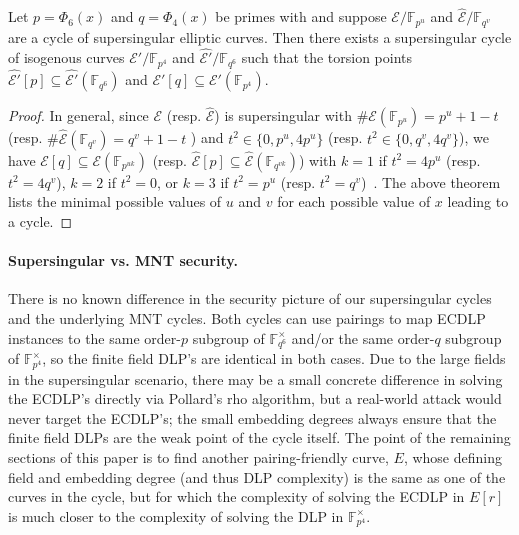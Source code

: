 \documentclass[version=preprint]{iacrcc}
\newcommand{\F}{\mathbb{F}}
\newcommand{\EC}{\mathcal{E}}
\begin{document}
\begin{corollary}\label{coll}
    Let $p=\Phi_6(x)$ and $q=\Phi_4(x)$ be primes with and suppose $\EC/\F_{p^u}$ and $\hat{\EC}/\F_{q^v}$ are a cycle of supersingular elliptic curves. Then there exists a supersingular cycle of isogenous curves $\EC'/\F_{p^4}$ and $\hat{\EC'}/\F_{q^6}$ such that the torsion points $\hat{\EC'}[p]\subseteq \hat{\EC'}(\F_{q^6})$ and $\EC'[q] \subseteq \EC'(\F_{p^4})$.
\end{corollary}
\begin{proof}
    In general, since $\EC$ (resp. $\hat{\EC}$) is supersingular with $\#\EC(\F_{p^u})=p^u+1-t$ (resp. $\#\hat{\EC}(\F_{q^v})=q^v+1- t$ ) and $t^2\in\{0,p^u,4p^u\}$ (resp. $t^2\in\{0,q^v,4q^v\}$), we have $\EC[q] \subseteq \EC(\F_{p^{uk}})$ (resp. $\hat{\EC}[p] \subseteq \hat{\EC}(\F_{q^{vk}})$) with $k=1$ if $t^2=4p^u$ (resp. $t^2=4q^v$), $k=2$ if $t^2=0$, or $k=3$ if $t^2=p^u$ (resp. $t^2=q^v$)~\cite[Table 1]{MOV}. The above theorem lists the minimal possible values of $u$ and $v$ for each possible value of $x$ leading to a cycle. 
\end{proof}

\paragraph{Supersingular vs. MNT security.} There is no known difference in the security picture of our supersingular cycles and the underlying MNT cycles. Both cycles can use pairings to map ECDLP instances to the same order-$p$ subgroup of $\F_{q^6}^\times$ and/or the same order-$q$ subgroup of $\F_{p^4}^\times$, so the finite field DLP's are identical in both cases. Due to the large fields in the supersingular scenario, there may be a small concrete difference in solving the ECDLP's directly via Pollard's rho algorithm, but a real-world attack would never target the ECDLP's; the small embedding degrees always ensure that the finite field DLPs are the weak point of the cycle itself. The point of the remaining sections of this paper is to find another pairing-friendly curve, $E$, whose defining field and embedding degree (and thus DLP complexity) is the same as one of the curves in the cycle, but for which the complexity of solving the ECDLP in $E[r]$ is much closer to the complexity of solving the DLP in $\F_{p^4}^\times$. 
\end{document}

